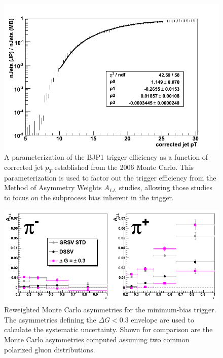 
\begin{figure}
  \includegraphics[width=1.0\textwidth]{figures/trigger-efficiency}
  \caption{A parameterization of the BJP1 trigger efficiency as a function of corrected jet $p_T$ established from the 2006 Monte Carlo.  This parameterization is used to factor out the trigger efficiency from the Method of Asymmetry Weights $A_{LL}$ studies, allowing those studies to focus on the subprocess bias inherent in the trigger.}
  \label{fig:trigger-efficiency}
\end{figure}

\begin{figure}
    \includegraphics[width=1.0\textwidth]{figures/mb_mcasym_2006}
    \caption{Reweighted Monte Carlo asymmetries for the minimum-bias trigger.  The asymmetries defining the $\Delta G < 0.3$ envelope are used to calculate the systematic uncertainty.  Shown for comparison are the Monte Carlo asymmetries computed assuming two common polarized gluon distributions.}
    \label{fig:mb-mcasym-2006}
\end{figure}

